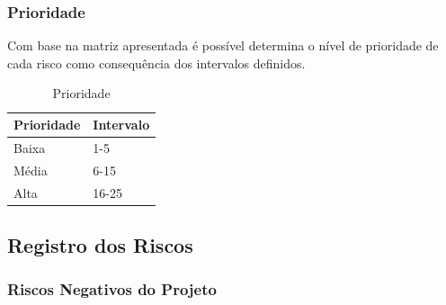\subsubsection{Prioridade}
Com base na matriz apresentada é possível determina o nível de prioridade de cada risco como consequência dos intervalos definidos.

\begin{table}[h]
\centering
\caption{Prioridade}
\label{prioridade}
\begin{tabular}{|l|l|}
\hline
Prioridade & Intervalo \\ 
\hline
Baixa      & 1-5       \\ 
Média      & 6-15      \\ 
Alta       & 16-25     \\ 
\hline
\end{tabular}
\end{table}

\subsection{Registro dos Riscos}

\subsubsection{Riscos Negativos do Projeto}

